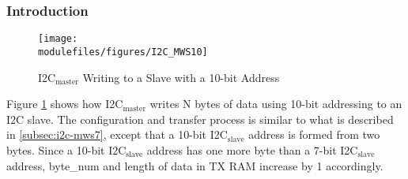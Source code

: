 \documentclass[main\_\_EN.tex]{subfiles}
\begin{document}
\subsubsection{Introduction}
\begin{figure}[H]
    \centering
    \texttt{[image: \\modulefiles/figures/I2C\_MWS10]}
    \caption{I2C$_\text{master}$ Writing to a Slave with a 10-bit Address}
    \label{fig:i2c-mws10}
\end{figure}

Figure \ref{fig:i2c-mws10} shows how I2C$_\text{master}$ writes N bytes of data using 10-bit addressing to an I2C slave. The configuration and transfer process is similar to what is described in \ref{subsec:i2c-mws7}, except that a 10-bit I2C$_\text{slave}$ address is formed from two bytes. Since a 10-bit I2C$_\text{slave}$ address has one more byte than a 7-bit I2C$_\text{slave}$ address, byte\_num and length of data in TX RAM increase by 1 accordingly.
\end{document}

